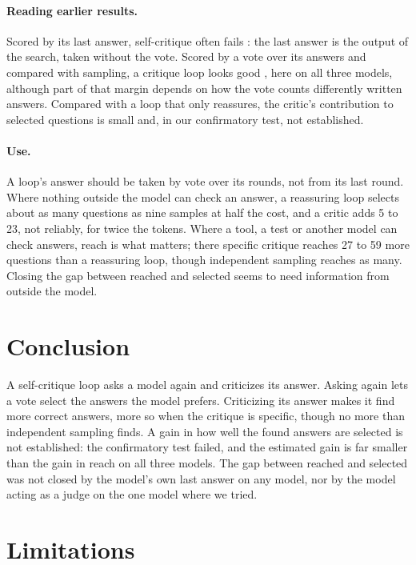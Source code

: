 \documentclass[11pt]{article}
\begin{document}
\paragraph{Reading earlier results.}
Scored by its last answer, self-critique often fails \citep{huang2024cannot,stechly2024selfverification}: the last answer is the output of the search, taken without the vote.
Scored by a vote over its answers and compared with sampling, a critique loop looks good \citep{bilal2026refining}, here on all three models, although part of that margin depends on how the vote counts differently written answers.
Compared with a loop that only reassures, the critic's contribution to selected questions is small and, in our confirmatory test, not established.

\paragraph{Use.}
A loop's answer should be taken by vote over its rounds, not from its last round.
Where nothing outside the model can check an answer, a reassuring loop selects about as many questions as nine samples at half the cost, and a critic adds 5 to 23, not reliably, for twice the tokens.
Where a tool, a test or another model can check answers, reach is what matters; there specific critique reaches 27 to 59 more questions than a reassuring loop, though independent sampling reaches as many.
Closing the gap between reached and selected seems to need information from outside the model.

\section{Conclusion}

A self-critique loop asks a model again and criticizes its answer.
Asking again lets a vote select the answers the model prefers.
Criticizing its answer makes it find more correct answers, more so when the critique is specific, though no more than independent sampling finds.
A gain in how well the found answers are selected is not established: the confirmatory test failed, and the estimated gain is far smaller than the gain in reach on all three models.
The gap between reached and selected was not closed by the model's own last answer on any model, nor by the model acting as a judge on the one model where we tried.

\section*{Limitations}
\end{document}
